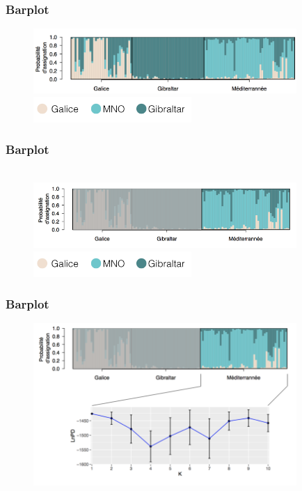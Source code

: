 \documentclass[10pt,xcolor=table]{beamer}\usepackage[]{graphicx}\usepackage[]{color}
\begin{document}
\begin{frame}
	\frametitle{Barplot}
	\begin{figure}
		\begin{center}
		\includegraphics[width=10cm]{barplot}\\[0.5cm]
		\includegraphics[width=6cm]{demileg}
		\end{center}
	\end{figure}
\end{frame}

\begin{frame}
	\frametitle{Barplot}
	\begin{figure}
		\begin{center}
			\\[0.5cm]
		\includegraphics[width=10cm]{barplotgris}\\[0.5cm]
		\includegraphics[width=6cm]{demileg}
		\end{center}
	\end{figure}
\end{frame}

\begin{frame}
	\frametitle{Barplot}
	\begin{figure}
		\begin{center}
		\includegraphics[width=10cm]{barln}\\[0.5cm]
		\end{center}
	\end{figure}
	\centering {} 	\\[2cm]
\end{frame}
\end{document}
